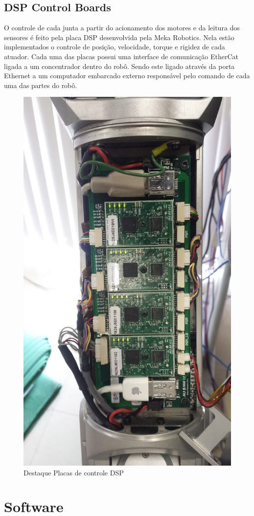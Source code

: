 \subsection{DSP Control Boards}

O controle de cada junta a partir do acionamento dos motores e da leitura dos sensores é feito pela placa DSP desenvolvida pela Meka Robotics. Nela estão implementados o controle de posição, velocidade, torque e rigidez de cada atuador. Cada uma das placas possui uma interface de comunicação EtherCat ligada a um concentrador dentro do robô. Sendo este ligado através da porta Ethernet a um computador embarcado externo responsável pelo comando de cada uma das partes do robô.

\begin{figure}[H]
    \centering
    \includegraphics[width = 0.7\linewidth]{figs/dsp-control-wrist.jpg}
    \caption{Destaque Placas de controle DSP}
    \label{fig:maxon-flat-servo}
\end{figure}

\section{Software}

